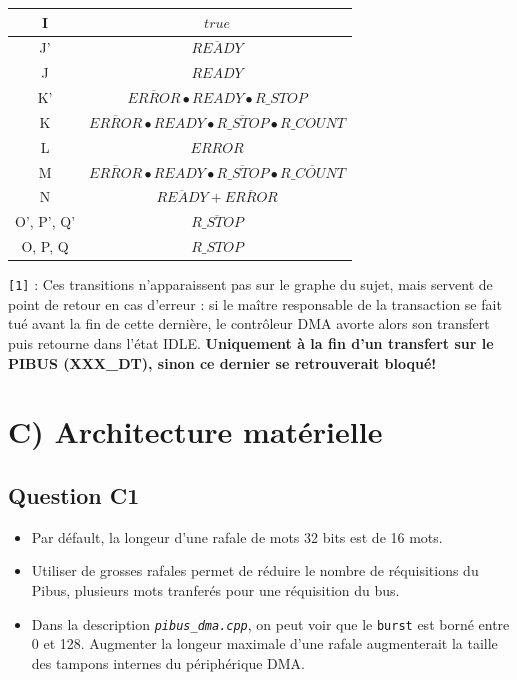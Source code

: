 \documentclass[10pt]{article}
\begin{document}
\begin{center}
\begin{tabular}{|c|c|}
    I   & $true$ \\ \hline
    J'  & $\overline{READY}$ \\ \hline
    J   & $READY$ \\ \hline
    K'\footnote[1] & $\overline{ERROR}\bullet{READY}\bullet{R\_STOP}$ \\ \hline
    K   & $\overline{ERROR}\bullet{READY}\bullet\overline{R\_STOP}\bullet{R\_COUNT}$ \\ \hline
    L   & ${ERROR}$ \\ \hline
    M   & $\overline{ERROR}\bullet{READY}\bullet\overline{R\_STOP}\bullet\overline{R\_COUNT}$ \\ \hline
    N   & $\overline{READY}+\overline{ERROR}$ \\ \hline
    O', P', Q' & $\overline{R\_STOP}$ \\ \hline
    O, P, Q & $R\_STOP$ \\ \hline
  \end{tabular}
\end{center}

\texttt{[1]} : Ces transitions n'apparaissent pas sur le graphe du sujet, mais
servent de point de retour en cas d'erreur : si le maître responsable de la
transaction se fait tué avant la fin de cette dernière, le contrôleur DMA
avorte alors son transfert puis retourne dans l'état IDLE. {\bf Uniquement à
la fin d'un transfert sur le PIBUS (XXX\_DT), sinon ce dernier se retrouverait
bloqué!}

\section{C) Architecture matérielle}

\subsection{Question C1}

\begin{itemize}
  \item Par défault, la longeur d'une rafale de mots 32 bits est de 16 mots.
  \item Utiliser de grosses rafales permet de réduire le nombre de réquisitions
  du Pibus, plusieurs mots tranferés pour une réquisition du bus.
  \item Dans la description \textit{\texttt{pibus\_dma.cpp}}, on peut voir que
  le \texttt{burst} est borné entre 0 et 128. Augmenter la longeur maximale
  d'une rafale augmenterait la taille des tampons internes du périphérique DMA.
\end{itemize}
\end{document}
